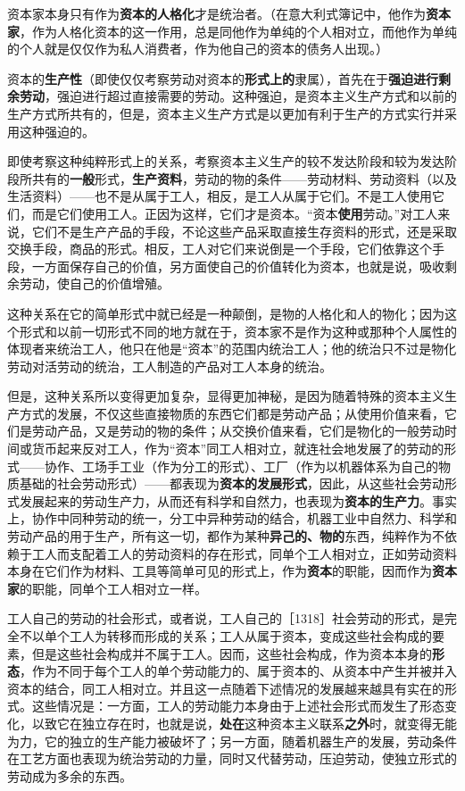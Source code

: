 资本家本身只有作为\textbf{资本的人格化}才是统治者。（在意大利式簿记中，他作为\textbf{资本家}，作为人格化资本的这一作用，总是同他作为单纯的个人相对立，而他作为单纯的个人就是仅仅作为私人消费者，作为他自己的资本的债务人出现。）

资本的\textbf{生产性}（即使仅仅考察劳动对资本的\textbf{形式上的}隶属），首先在于\textbf{强迫进行剩余劳动}，强迫进行超过直接需要的劳动。这种强迫，是资本主义生产方式和以前的生产方式所共有的，但是，资本主义生产方式是以更加有利于生产的方式实行并采用这种强迫的。

即使考察这种纯粹形式上的关系，考察资本主义生产的较不发达阶段和较为发达阶段所共有的\textbf{一般}形式，\textbf{生产资料}，劳动的物的条件——劳动材料、劳动资料（以及生活资料）——也不是从属于工人，相反，是工人从属于它们。不是工人使用它们，而是它们使用工人。正因为这样，它们才是资本。“资本\textbf{使用}劳动。”对工人来说，它们不是生产产品的手段，不论这些产品采取直接生存资料的形式，还是采取交换手段，商品的形式。相反，工人对它们来说倒是一个手段，它们依靠这个手段，一方面保存自己的价值，另方面使自己的价值转化为资本，也就是说，吸收剩余劳动，使自己的价值增殖。

这种关系在它的简单形式中就已经是一种颠倒，是物的人格化和人的物化；因为这个形式和以前一切形式不同的地方就在于，资本家不是作为这种或那种个人属性的体现者来统治工人，他只在他是“资本”的范围内统治工人；他的统治只不过是物化劳动对活劳动的统治，工人制造的产品对工人本身的统治。

但是，这种关系所以变得更加复杂，显得更加神秘，是因为随着特殊的资本主义生产方式的发展，不仅这些直接物质的东西\fontbox{~\{}它们都是劳动产品；从使用价值来看，它们是劳动产品，又是劳动的物的条件；从交换价值来看，它们是物化的一般劳动时间或货币\fontbox{\}~}起来反对工人，作为“资本”同工人相对立，就连社会地发展了的劳动的形式——协作、工场手工业（作为分工的形式）、工厂（作为以机器体系为自己的物质基础的社会劳动形式）——都表现为\textbf{资本的发展形式}，因此，从这些社会劳动形式发展起来的劳动生产力，从而还有科学和自然力，也表现为\textbf{资本的生产力}。事实上，协作中同种劳动的统一，分工中异种劳动的结合，机器工业中自然力、科学和劳动产品的用于生产，所有这一切，都作为某种\textbf{异己的、物的}东西，纯粹作为不依赖于工人而支配着工人的劳动资料的存在形式，同单个工人相对立，正如劳动资料本身在它们作为材料、工具等简单可见的形式上，作为\textbf{资本}的职能，因而作为\textbf{资本家}的职能，同单个工人相对立一样。

工人自己的劳动的社会形式，或者说，工人自己的［1318］社会劳动的形式，是完全不以单个工人为转移而形成的关系；工人从属于资本，变成这些社会构成的要素，但是这些社会构成并不属于工人。因而，这些社会构成，作为资本本身的\textbf{形态}，作为不同于每个工人的单个劳动能力的、属于资本的、从资本中产生并被并入资本的结合，同工人相对立。并且这一点随着下述情况的发展越来越具有实在的形式。这些情况是：一方面，工人的劳动能力本身由于上述社会形式而发生了形态变化，以致它在独立存在时，也就是说，\textbf{处在}这种资本主义联系\textbf{之外}时，就变得无能为力，它的独立的生产能力被破坏了；另一方面，随着机器生产的发展，劳动条件在工艺方面也表现为统治劳动的力量，同时又代替劳动，压迫劳动，使独立形式的劳动成为多余的东西。


